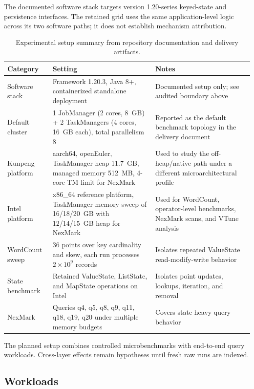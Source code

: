 \documentclass[journal]{IEEEtran}
\begin{document}
The documented software stack targets version 1.20-series keyed-state and persistence interfaces. The retained grid uses the same application-level logic across its two software paths; it does not establish mechanism attribution.

\begin{table}[t]
\caption{Experimental setup summary from repository documentation and delivery artifacts.}
\label{tab:setup}
\centering
\small
\begin{tabularx}{\textwidth}{L{2.1cm}L{3.1cm}Y}
\toprule
Category & Setting & Notes \\
\midrule
Software stack & Framework 1.20.3, Java 8+, containerized standalone deployment & Documented setup only; see audited boundary above \\
Default cluster & 1 JobManager (2 cores, 8~GB) + 2 TaskManagers (4 cores, 16~GB each), total parallelism 8 & Reported as the default benchmark topology in the delivery document \\
Kunpeng platform & aarch64, openEuler, TaskManager heap 11.7~GB, managed memory 512~MB, 4-core TM limit for NexMark & Used to study the off-heap/native path under a different microarchitectural profile \\
Intel platform & x86\_64 reference platform, TaskManager memory sweep of 16/18/20~GB with 12/14/15~GB heap for NexMark & Used for WordCount, operator-level benchmarks, NexMark scans, and VTune analysis \\
WordCount sweep & 36 points over key cardinality and skew, each run processes $2\times10^9$ records & Isolates repeated ValueState read-modify-write behavior \\
State benchmark & Retained ValueState, ListState, and MapState operations on Intel & Isolates point updates, lookups, iteration, and removal \\
NexMark & Queries q4, q5, q8, q9, q11, q18, q19, q20 under multiple memory budgets & Covers state-heavy query behavior \\
\bottomrule
\end{tabularx}
\end{table}

The planned setup combines controlled microbenchmarks with end-to-end query workloads. Cross-layer effects remain hypotheses until fresh raw runs are indexed.

\subsection{Workloads}
\end{document}
